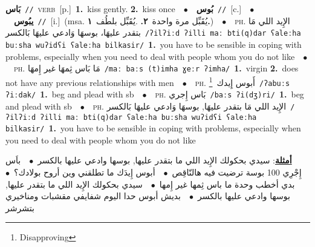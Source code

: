\documentclass[10pt,a4paper,twoside]{article} %
\begin{document}
\begin{multicols}{2}
{\setlength\topsep{0pt}\textbf{\foreignlanguage{arabic}{بَاس}}\ {\color{gray}\texttt{//}\color{black}}\ \textsc{verb}\ [p.]\ \textbf{1.}~kiss gently.  \textbf{2.}~kiss once\ \ $\bullet$\ \ \setlength\topsep{0pt}\textbf{\foreignlanguage{arabic}{بُوس}}\ {\color{gray}\texttt{//}\color{black}}\ [c.]\ \ $\bullet$\ \ \setlength\topsep{0pt}\textbf{\foreignlanguage{arabic}{يبُوس}}\ {\color{gray}\texttt{//}\color{black}}\ [i.]\ \color{gray}(msa. \foreignlanguage{arabic}{يُقَبِّل مرة واحدة}~\foreignlanguage{arabic}{\textbf{٢.}}  .\foreignlanguage{arabic}{يُقَبِّل بلطُف}~\foreignlanguage{arabic}{\textbf{١.}})\color{black}\ \ $\bullet$\ \ \textsc{ph.} \color{gray} \foreignlanguage{arabic}{الإِيد اللي مَا بتقدر عليهَا، بوسهَا وَادعي عليهَا بَالكسر}\color{black}\ {\color{gray}\texttt{/{\sffamily ʔilʔiːd ʔilli maː bti(q)dar ʕaleːha buːsha wuʔidʕi ʕaleːha bilkasir}/}\color{black}}\ \textbf{1.}~you have to be sensible in coping with problems, especially when you need to deal with people whom you do not like\ \ $\bullet$\ \ \textsc{ph.} \color{gray} \foreignlanguage{arabic}{مَا بَاس ثِمهَا غير إِمهَا}\color{black}\ {\color{gray}\texttt{/{\sffamily maː baːs (t)imha ɣeːr ʔimha}/}\color{black}}\ \textbf{1.}~virgin  \textbf{2.}~does not have any previous relationships with men\ \ $\bullet$\ \ \textsc{ph.} \color{gray} \foreignlanguage{arabic}{أَبوس إِيدك}\color{black}\ \footnote{Disapproving}\ {\color{gray}\texttt{/{\sffamily ʔabuːs ʔiːdak}/}\color{black}}\ \textbf{1.}~beg and plead with sb\ \ $\bullet$\ \ \textsc{ph.} \color{gray} \foreignlanguage{arabic}{بَاس إِجري}\color{black}\ {\color{gray}\texttt{/{\sffamily baːs ʔi(dʒ)ri}/}\color{black}}\ \textbf{1.}~beg and plead with sb\ \ $\bullet$\ \ \textsc{ph.} \color{gray} \foreignlanguage{arabic}{الإِيد اللي مَا بتقدر عليهَا, بوسهَا وَادعي عليهَا بَالكسر}\color{black}\ {\color{gray}\texttt{/{\sffamily ʔilʔiːd ʔilli maː bti(q)dar ʕaleːha buːsha wuʔidʕi ʕaleːha bilkasir}/}\color{black}}\ \textbf{1.}~you have to be sensible in coping with problems, especially when you need to deal with people whom you do not like\  \begin{flushright}\color{gray}\foreignlanguage{arabic}{\textbf{\underline{\foreignlanguage{arabic}{أمثلة}}}: سيدي بحكولك الإِيد اللي ما بتقدر عليها, بوسها وادعي عليها بالكسر\ $\bullet$\ \  باَس إِجْرِي 100 بوسة ترضيت فيه هالنّاقِص\ $\bullet$\ \  أبوس إِيدَك ما تطلقني وين أروح بولادك؟\ $\bullet$\ \  بدي أخطب وحدة ما باس ثِمها غير إِمها\ $\bullet$\ \  سيدي بحكولك الإِيد اللي ما بتقدر عليها, بوسها وادعي عليها بالكسر\ $\bullet$\ \  بديش أبوس حدا اليوم شفايفي مقشبات ومناخيري بتشرشر}\end{flushright}\color{black}} \vspace{2mm}


\end{multicols}
\end{document}
